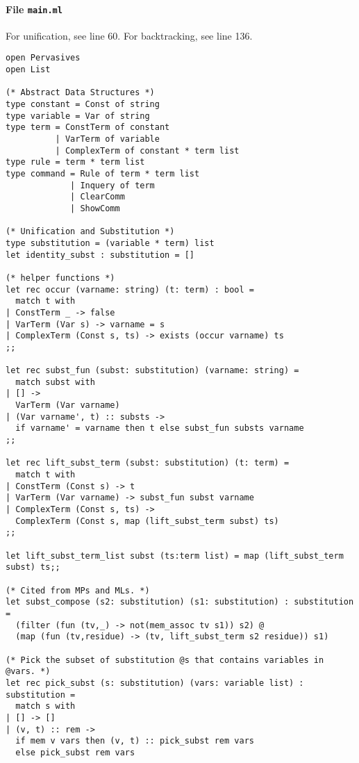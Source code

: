 \documentclass{article}
\begin{document}
\paragraph{File \tt main.ml}
For unification, see line 60. For backtracking, see line 136.
\begin{verbatim}
open Pervasives
open List

(* Abstract Data Structures *)
type constant = Const of string                  
type variable = Var of string                 
type term = ConstTerm of constant 
          | VarTerm of variable 
          | ComplexTerm of constant * term list
type rule = term * term list
type command = Rule of term * term list 
             | Inquery of term 
             | ClearComm 
             | ShowComm

(* Unification and Substitution *)
type substitution = (variable * term) list
let identity_subst : substitution = []

(* helper functions *)
let rec occur (varname: string) (t: term) : bool =
  match t with
| ConstTerm _ -> false
| VarTerm (Var s) -> varname = s
| ComplexTerm (Const s, ts) -> exists (occur varname) ts
;;

let rec subst_fun (subst: substitution) (varname: string) = 
  match subst with 
| [] -> 
  VarTerm (Var varname)
| (Var varname', t) :: substs -> 
  if varname' = varname then t else subst_fun substs varname
;;

let rec lift_subst_term (subst: substitution) (t: term) = 
  match t with 
| ConstTerm (Const s) -> t
| VarTerm (Var varname) -> subst_fun subst varname
| ComplexTerm (Const s, ts) -> 
  ComplexTerm (Const s, map (lift_subst_term subst) ts)
;;

let lift_subst_term_list subst (ts:term list) = map (lift_subst_term subst) ts;;

(* Cited from MPs and MLs. *)
let subst_compose (s2: substitution) (s1: substitution) : substitution =
  (filter (fun (tv,_) -> not(mem_assoc tv s1)) s2) @ 
  (map (fun (tv,residue) -> (tv, lift_subst_term s2 residue)) s1)

(* Pick the subset of substitution @s that contains variables in @vars. *)
let rec pick_subst (s: substitution) (vars: variable list) : substitution =
  match s with
| [] -> []
| (v, t) :: rem -> 
  if mem v vars then (v, t) :: pick_subst rem vars
  else pick_subst rem vars


\end{verbatim}
\end{document}
